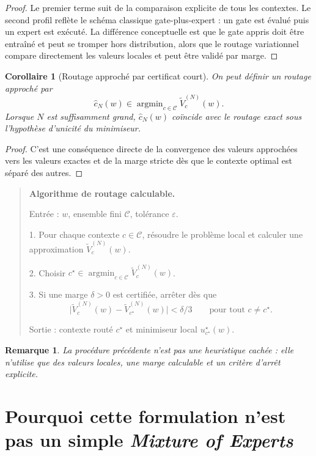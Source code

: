 \documentclass[11pt,a4paper]{article}
\newtheorem{corollary}{Corollaire}[section]
\newtheorem{remark}{Remarque}[section]
\DeclareMathOperator{\argmin}{argmin}
\newcommand{\Ccal}{\mathcal C}
\begin{document}
\begin{proof}
Le premier terme suit de la comparaison explicite de tous les contextes. Le second profil reflète le schéma classique gate-plus-expert : un gate est évalué puis un expert est exécuté. La différence conceptuelle est que le gate appris doit être entraîné et peut se tromper hors distribution, alors que le routage variationnel compare directement les valeurs locales et peut être validé par marge.
\end{proof}

\begin{corollary}[Routage approché par certificat court]
On peut définir un routage approché par
\[
\hat c_N(w)\in\argmin_{c\in\Ccal}\widetilde V_c^{(N)}(w).
\]
Lorsque \(N\) est suffisamment grand, \(\hat c_N(w)\) coïncide avec le routage exact sous l'hypothèse d'unicité du minimiseur.
\end{corollary}

\begin{proof}
C'est une conséquence directe de la convergence des valeurs approchées vers les valeurs exactes et de la marge stricte dès que le contexte optimal est séparé des autres.
\end{proof}

\begin{quote}
\small
\textbf{Algorithme de routage calculable.}

Entrée : \(w\), ensemble fini \(\Ccal\), tolérance \(\varepsilon\).

1. Pour chaque contexte \(c\in\Ccal\), résoudre le problème local et calculer une approximation \(\widetilde V_c^{(N)}(w)\).

2. Choisir \(c^\star\in\argmin_{c\in\Ccal}\widetilde V_c^{(N)}(w)\).

3. Si une marge \(\delta>0\) est certifiée, arrêter dès que
\[
\bigl|\widetilde V_c^{(N)}(w)-\widetilde V_{c^\star}^{(N)}(w)\bigr|<\delta/3
\qquad\text{pour tout }c\neq c^\star.
\]

Sortie : contexte routé \(c^\star\) et minimiseur local \(u_{c^\star}^\star(w)\).
\end{quote}

\begin{remark}
La procédure précédente n'est pas une heuristique cachée : elle n'utilise que des valeurs locales, une marge calculable et un critère d'arrêt explicite.
\end{remark}

\section{Pourquoi cette formulation n'est pas un simple \emph{Mixture of Experts}}
\end{document}
